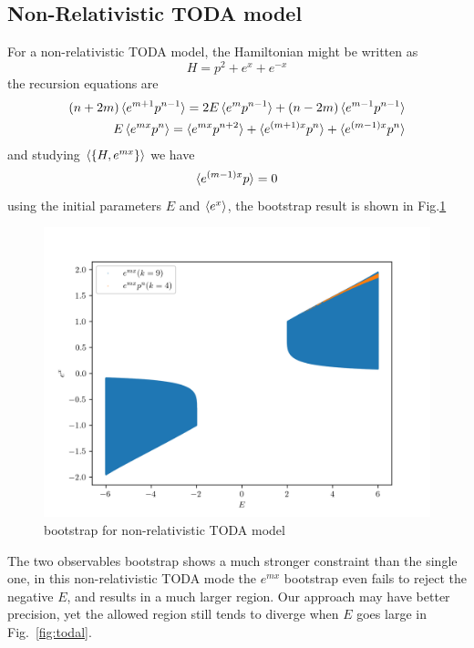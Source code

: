 \documentclass[aps, preprint,amsmath, amssymb]{revtex4-2}
\begin{document}
\subsection{Non-Relativistic TODA model}
For a non-relativistic TODA model, the Hamiltonian might be written as
\begin{equation}
	H = p^2 + e^x + e^{-x}
\end{equation}
the recursion equations are
\begin{align}
	(n + 2m)\braket{e^{m + 1} p^{n - 1}} = 2E\braket{e^m p^{n - 1}} + (n - 2m)\braket{e^{m - 1} p^{n - 1}}\notag \\
	E\braket{e^{mx} p^n} = \braket{e^{mx} p^{n + 2}} + \braket{e^{(m + 1)x} p^n} + \braket{e^{(m - 1)x} p^n}
\end{align}
and studying $\braket{\{H, e^{mx}\}}$ we have
\begin{equation}
	\braket{e^{(m - 1)x} p} = 0
\end{equation}
using the initial parameters $E$ and $\braket{e^x}$, the bootstrap result is shown in Fig.\ref{fig:toda}
\begin{figure}
	\includegraphics[width=0.8\linewidth]{toda_compare.png}
    \caption{ bootstrap for non-relativistic TODA model}
	\label{fig:toda}
\end{figure}

The two observables bootstrap shows a much stronger constraint than the single one, in this non-relativistic TODA mode the $e^{mx}$ bootstrap even fails to reject the negative $E$, and results in a much larger region. Our approach may have better precision, yet the allowed region still tends to diverge when $E$ goes large in Fig.~\ref{fig:todal}.
\end{document}
